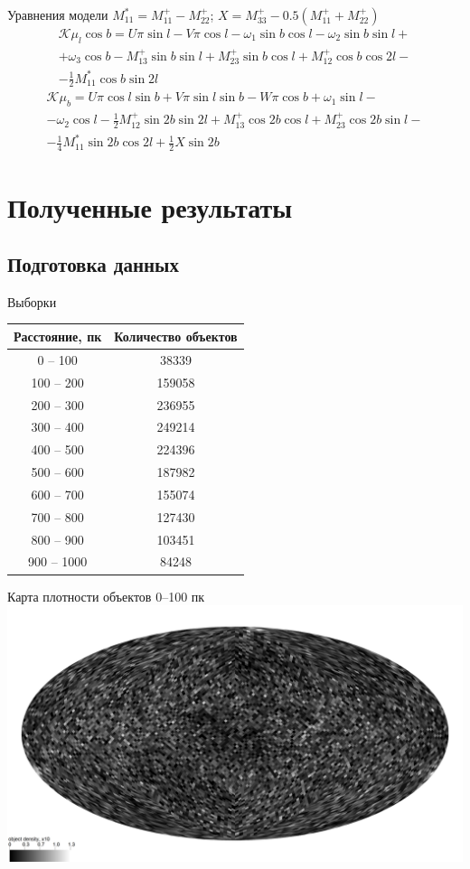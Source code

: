 \documentclass{beamer}
\begin{document}
\begin{frame}{Уравнения модели}
$M_{11}^*=M_{11}^+-M_{22}^+$; $X=M_{33}^+-0.5\left(M_{11}^++M_{22}^+\right)$
\begin{multline}\label{Kmul_plus}
\mathcal{K}\mu_l\cos b=U\pi\sin l-V\pi\cos l-\omega_1\sin b\cos l-\omega_2\sin b\sin l+\\+\omega_3\cos b-M_{13}^+\sin b\sin l+M_{23}^+\sin b\cos l+M_{12}^+\cos b\cos2l-\\-\frac{1}{2}M_{11}^*\cos b\sin2l
\end{multline}
\begin{multline}\label{Kmub_plus}
\mathcal{K}\mu_b=U\pi\cos l\sin b+V\pi\sin l\sin b-W\pi\cos b+\omega_1\sin l-\\-\omega_2\cos l-\frac{1}{2}M_{12}^+\sin2b\sin2l+M_{13}^+\cos2b\cos l+M_{23}^+\cos2b\sin l-\\-\frac{1}{4}M_{11}^*\sin2b\cos2l+\frac{1}{2}X\sin2b
\end{multline}
\end{frame}

\section{Полученные результаты}
\subsection{Подготовка данных}
\begin{frame}{Выборки}
\begin{tabular}{|c|c|}
\hline
Расстояние, пк&Количество объектов\\
\hline
0 -- 100&38339\\
100 -- 200&159058\\
200 -- 300&236955\\
300 -- 400&249214\\
400 -- 500&224396\\
500 -- 600&187982\\
600 -- 700&155074\\
700 -- 800&127430\\
800 -- 900&103451\\
900 -- 1000&84248\\
\hline
\end{tabular}
\end{frame}

\begin{frame}{Карта плотности объектов 0--100 пк}
\includegraphics[width=1\linewidth]{healpdens100.jpg}
\end{frame}
\end{document}

